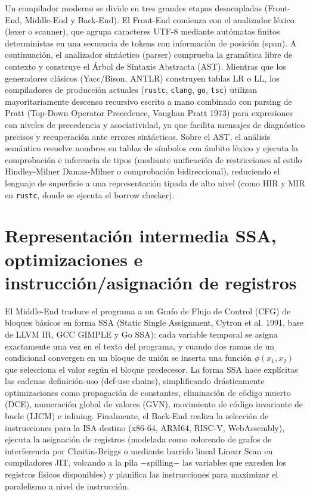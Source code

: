 \documentclass{book}
\begin{document}
Un compilador moderno se divide en tres grandes etapas desacopladas (Front-End, Middle-End y Back-End). El Front-End comienza con el analizador léxico (lexer o scanner), que agrupa caracteres UTF-8 mediante autómatas finitos deterministas en una secuencia de tokens con información de posición (span). A continuación, el analizador sintáctico (parser) comprueba la gramática libre de contexto y construye el Árbol de Sintaxis Abstracta (AST). Mientras que los generadores clásicos (Yacc/Bison, ANTLR) construyen tablas LR o LL, los compiladores de producción actuales (\texttt{rustc}, \texttt{clang}, \texttt{go}, \texttt{tsc}) utilizan mayoritariamente descenso recursivo escrito a mano combinado con parsing de Pratt (Top-Down Operator Precedence, Vaughan Pratt 1973) para expresiones con niveles de precedencia y asociatividad, ya que facilita mensajes de diagnóstico precisos y recuperación ante errores sintácticos.
Sobre el AST, el análisis semántico resuelve nombres en tablas de símbolos con ámbito léxico y ejecuta la comprobación e inferencia de tipos (mediante unificación de restricciones al estilo Hindley-Milner Damas-Milner o comprobación bidireccional), reduciendo el lenguaje de superficie a una representación tipada de alto nivel (como HIR y MIR en \texttt{rustc}, donde se ejecuta el borrow checker).

\section{Representación intermedia SSA, optimizaciones e instrucción/asignación de registros}

El Middle-End traduce el programa a un Grafo de Flujo de Control (CFG) de bloques básicos en forma SSA (Static Single Assignment, Cytron et al. 1991, base de LLVM IR, GCC GIMPLE y Go SSA): cada variable temporal se asigna exactamente una vez en el texto del programa, y cuando dos ramas de un condicional convergen en un bloque de unión se inserta una función \(\phi(x_1, x_2)\) que selecciona el valor según el bloque predecesor. La forma SSA hace explícitas las cadenas definición-uso (def-use chains), simplificando drásticamente optimizaciones como propagación de constantes, eliminación de código muerto (DCE), numeración global de valores (GVN), movimiento de código invariante de bucle (LICM) e inlining.
Finalmente, el Back-End realiza la selección de instrucciones para la ISA destino (x86-64, ARM64, RISC-V, WebAssembly), ejecuta la asignación de registros (modelada como coloreado de grafos de interferencia por Chaitin-Briggs o mediante barrido lineal Linear Scan en compiladores JIT, volcando a la pila \(-\)spilling\(-\) las variables que exceden los registros físicos disponibles) y planifica las instrucciones para maximizar el paralelismo a nivel de instrucción.
\end{document}
